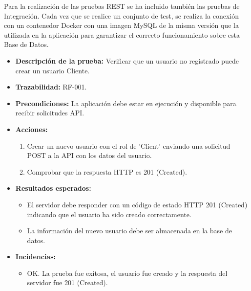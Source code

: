 Para la realización de las pruebas REST se ha incluido también las pruebas de Integración. Cada vez que se realice un conjunto de test, se realiza la conexión con 
un contenedor Docker con una imagen MySQL de la misma versión que la utilizada en la aplicación para garantizar el correcto funcionamiento sobre esta Base de Datos.


\begin{itemize}
    \item \textbf{Descripción de la prueba:} Verificar que un usuario no registrado puede crear un usuario Cliente.
    \item \textbf{Trazabilidad:} RF-001.
    \item \textbf{Precondiciones:} La aplicación debe estar en ejecución y disponible para recibir solicitudes API.
    \item \textbf{Acciones:}
    \begin{enumerate} 
        \item Crear un nuevo usuario con el rol de 'Client' enviando una solicitud POST a la API con los datos del usuario.
        \item Comprobar que la respuesta HTTP es 201 (Created).
    \end{enumerate}
    \item \textbf{Resultados esperados:}
    \begin{itemize}
        \item El servidor debe responder con un código de estado HTTP 201 (Created) indicando que el usuario ha sido creado correctamente.
        \item La información del nuevo usuario debe ser almacenada en la base de datos.
    \end{itemize}
    \item \textbf{Incidencias:}
    \begin{itemize}
        \item OK. La prueba fue exitosa, el usuario fue creado y la respuesta del servidor fue 201 (Created).
    \end{itemize}
\end{itemize}

